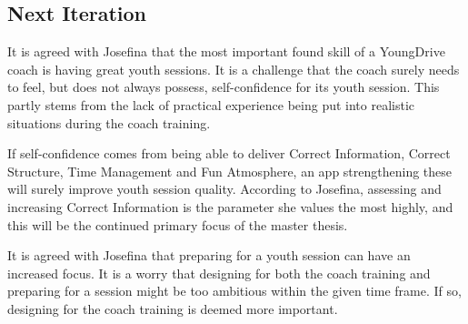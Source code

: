 \subsection{Next Iteration}
It is agreed with Josefina that the most important found skill of a YoungDrive coach is having great youth sessions. It is a challenge that the coach surely needs to feel, but does not always possess, self-confidence for its youth session. This partly stems from the lack of practical experience being put into realistic situations during the coach training.

If self-confidence comes from being able to deliver Correct Information, Correct Structure, Time Management and Fun Atmosphere, an app strengthening these will surely improve youth session quality. According to Josefina, assessing and increasing Correct Information is the parameter she values the most highly, and this will be the continued primary focus of the master thesis.

It is agreed with Josefina that preparing for a youth session can have an increased focus. It is a worry that designing for both the coach training and preparing for a session might be too ambitious within the given time frame. If so, designing for the coach training is deemed more important.
